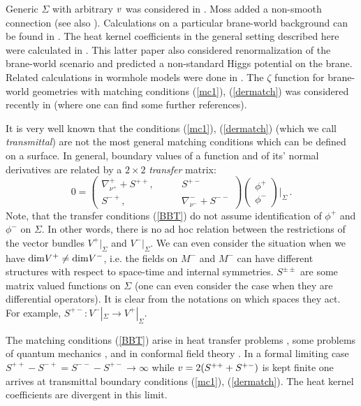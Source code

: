Generic $\Sigma$ with arbitrary $v$ was considered in
\cite{Bordag:1999ed}. Moss \cite{Moss:2000gv} added a non-smooth
connection (see also \cite{Drozdov:2002um}).
Calculations on a particular brane-world background can be found
in \cite{Nojiri:2000bz}.
The heat kernel coefficients in the general setting
described here were calculated in \cite{Gilkey:2001mj}. This latter
paper also considered renormalization of the brane-world scenario
and predicted a non-standard Higgs potential on the brane.
Related calculations in 
wormhole models were done in 
\cite{Khusnutdinov:2002qb,Khusnutdinov:2003ii}. The $\zeta$
function for brane-world geometries with matching conditions
(\ref{mc1}), (\ref{dermatch}) was considered recently in
\cite{Elizalde:2002dd,Moss:2003zk} 
(where one can find some further references).

It is very well known \cite{Albeverio:1988}
that the conditions (\ref{mc1}),
(\ref{dermatch}) (which we call {\it transmittal}) are not the most
general matching conditions which can be defined on a surface. 
In general, boundary values of a function and of its' normal
derivatives are related by a $2\times 2$ {\it transfer} matrix:
\begin{equation}
0=
     \left(\begin{array}{cc}
          \nabla_{\nu^+}^++S^{++},\qquad&S^{+-}\\
          S^{-+},\qquad&\nabla_{\nu^-}^-+S^{--}\end{array}\right)
      \left(\begin{array}{l}\phi^+\\\phi^-\end{array}\right)
\bigg|_\Sigma\,.\label{BBT}
\end{equation} 
Note, that the transfer conditions (\ref{BBT}) do not assume
identification of $\phi^+$ and $\phi^-$ on $\Sigma$. In other
words, there is no ad hoc relation between the restrictions
of the vector bundles $V^+|_\Sigma$ and $V^-|_\Sigma$. We can even
consider the situation when we have ${\rm dim}V^+\ne{\rm dim}V^-$,
i.e. the fields on $M^-$ and $M^-$ can have different structures
with respect to space-time and internal symmetries. $S^{\pm\pm}$
are some matrix valued functions on $\Sigma$ (one can even consider
the case when they are differential operators). It is clear from
the notations on which spaces they act. For example,
$S^{+-}: V^-|_\Sigma\to V^+|_\Sigma$.

The matching conditions (\ref{BBT}) arise in heat transfer problems
\cite{Carslaw:1986}, some problems of quantum mechanics 
\cite{Grosche:1994uv}, and in conformal field theory
\cite{Bachas:2001vj}. In a formal limiting case 
$S^{++}-S^{-+}=S^{--}-S^{+-} \to \infty$ while 
$v =2(S^{++}+S^{+-})$ is kept finite one arrives at transmittal
boundary conditions (\ref{mc1}), (\ref{dermatch}). The heat kernel
coefficients are divergent in this limit.

